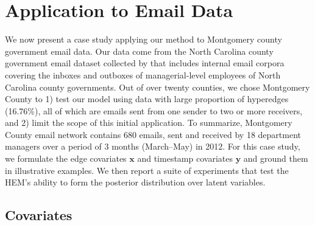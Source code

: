 \documentclass[ba]{imsart}
\numberwithin{equation}{section}
\theoremstyle{plain}
\begin{document}
 	   \section{Application to Email Data}\label{subsec:Emails}
 	   We now present a case study applying our method to Montgomery county government email data.
 	   Our data come from the North Carolina county government email dataset collected by \cite{ben2017transparency} that includes internal email corpora covering the inboxes and outboxes of managerial-level employees of North Carolina county governments. Out of over twenty counties, we chose Montgomery County to 1) test our model using data with large proportion of hyperedges (16.76\%), all of which are emails sent from one sender to two or more receivers, and 2) limit the scope of this initial application. To summarize, Montgomery County email network contains 680 emails, sent and received by 18 department managers over a period of 3 months (March--May) in 2012. For this case study,
 	   we formulate the edge covariates $\boldsymbol{x}$ and timestamp covariates $\boldsymbol{y}$ and ground them in illustrative examples. We then report a suite of experiments that test the HEM's ability to form the posterior distribution over latent variables. 
 	   \subsection{Covariates}\label{subsec:Covariates_email}
\end{document}
